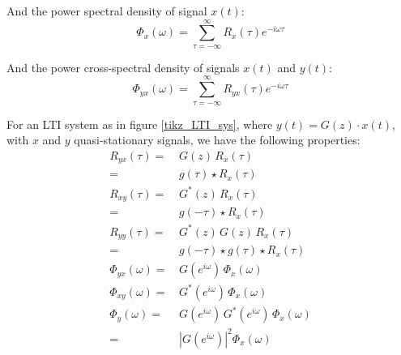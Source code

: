 \documentclass[  10pt, twoside]{report} %
\numberwithin{equation}{chapter}
\begin{document}
And the power spectral density of signal $x(t)$:
\begin{equation}
    \Phi_{x}(\omega)  = \sum_{\tau= -\infty}^{\infty} R_{x}(\tau) e^{-i \omega \tau}
\end{equation}

And the power cross-spectral density of signals $x(t)$ and $y(t)$:
\begin{equation}
    \Phi_{yx}(\omega) = \sum_{\tau= -\infty}^{\infty} R_{yx}(\tau)e^{-i \omega \tau} 
\end{equation} 

For an LTI system as in figure \ref{tikz_LTI_sys}, where $y(t) = G(z) \cdot x(t)$, with $x$ and $y$ quasi-stationary signals, we have the following properties:
\begin{align}
    R_{yx}(\tau) =& \, G(z) \,  R_{x}(\tau)  \\
                    =& \, g(\tau) \star  R_{x}(\tau) \nonumber \\[2mm]
    R_{xy}(\tau) =& \, G^{*}(z) \,  R_{x}(\tau)   \\
                    =& \, g(-\tau) \star  R_{x}(\tau) \nonumber \\[2mm]
    R_{yy}(\tau) =& \, G^{*}(z) \, G(z) \, R_{x}(\tau)   \\
                    =& \, g(-\tau) \star g(\tau) \star R_{x}(\tau) \\[2mm]
    \Phi_{yx}(\omega) =& \, G(e^{i\omega}) \,  \Phi_{x}(\omega) \\[2mm]
    \Phi_{xy}(\omega) =& \, G^{*}(e^{i\omega}) \,  \Phi_{x}(\omega) \\[2mm]
    \Phi_{y}(\omega)  =& \, G(e^{i\omega}) \, G^{*}(e^{i\omega}) \,\Phi_{x}(\omega)\\
                        =& \, \left|G(e^{i\omega})\right|^2 \Phi_{x}(\omega) \nonumber 
\end{align}
\end{document}
